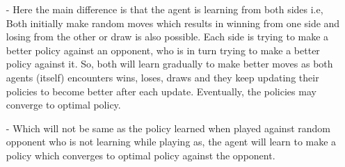 \documentclass [11pt]{article}
\numberwithin{equation}{section}
\begin{document}
\begin{itemize}
\item[-] Here the main difference is that the agent is learning from both sides i.e, Both initially make random moves which results in winning from one side and losing from the other or draw is also possible. Each side is trying to make a better policy against an opponent, who is in turn trying to make a better policy against it. So, both will learn gradually to make better moves as both agents (itself) encounters wins, loses, draws and they keep updating their policies to become better after each update. Eventually, the policies may converge to optimal policy. 

\item[-] Which will not be same as the policy learned when played against random opponent who is not learning while playing as, the agent will learn to make a policy which converges to optimal policy against the opponent. 



\end{itemize}
\end{document}
